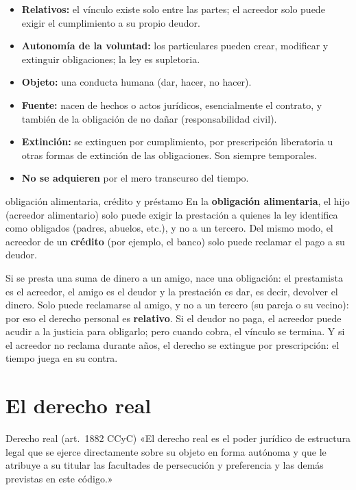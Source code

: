 \documentclass[12pt,oneside]{book}
\begin{document}
\begin{itemize}
    \item \textbf{Relativos:} el vínculo existe solo entre las partes; el acreedor solo puede exigir el cumplimiento a su propio deudor.
    \item \textbf{Autonomía de la voluntad:} los particulares pueden crear, modificar y extinguir obligaciones; la ley es supletoria.
    \item \textbf{Objeto:} una conducta humana (dar, hacer, no hacer).
    \item \textbf{Fuente:} nacen de hechos o actos jurídicos, esencialmente el contrato, y también de la obligación de no dañar (responsabilidad civil).
    \item \textbf{Extinción:} se extinguen por cumplimiento, por prescripción liberatoria u otras formas de extinción de las obligaciones. Son siempre temporales.
    \item \textbf{No se adquieren} por el mero transcurso del tiempo.
\end{itemize}

\begin{ejemplo}{obligación alimentaria, crédito y préstamo}
En la \textbf{obligación alimentaria}, el hijo (acreedor alimentario) solo puede exigir la prestación a quienes la ley identifica como obligados (padres, abuelos, etc.), y no a un tercero. Del mismo modo, el acreedor de un \textbf{crédito} (por ejemplo, el banco) solo puede reclamar el pago a su deudor.

Si se presta una suma de dinero a un amigo, nace una obligación: el prestamista es el acreedor, el amigo es el deudor y la prestación es dar, es decir, devolver el dinero. Solo puede reclamarse al amigo, y no a un tercero (su pareja o su vecino): por eso el derecho personal es \textbf{relativo}. Si el deudor no paga, el acreedor puede acudir a la justicia para obligarlo; pero cuando cobra, el vínculo se termina. Y si el acreedor no reclama durante años, el derecho se extingue por prescripción: el tiempo juega en su contra.
\end{ejemplo}

\section{El derecho real}

\begin{definicion}{Derecho real (art.~1882 CCyC)}
«El derecho real es el poder jurídico de estructura legal que se ejerce directamente sobre su objeto en forma autónoma y que le atribuye a su titular las facultades de persecución y preferencia y las demás previstas en este código.»
\end{definicion}
\end{document}
